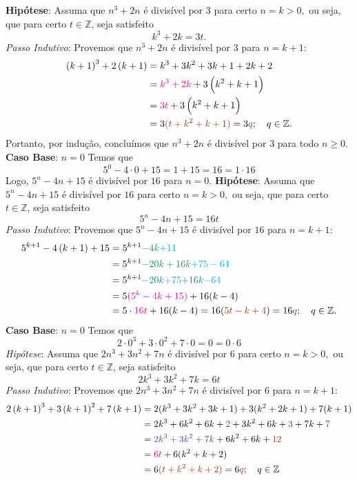 \documentclass[12pt, a4paper]{article}
\newcommand{\negrito}[1]{\mbox{\boldmath{$#1$}}}
\newcommand{\Z}{\mathbb{Z}}
\newcommand{\alt}[1]{\textcolor{Floresta}{$\negrito{(#1)} $}}
\begin{document}
\begin{solution}
{\textbf{Hipótese}: Assuma que $n^3 + 2n$ é divisível por $3$ para certo $n=k>0,$ ou seja, que para certo $t \in \Z$, seja satisfeito
$$k^{3}+2k=3t.$$
\textit{Passo Indutivo}: Provemos que $n^3 + 2n$ é divisível por $3$ para $n=k+1:$
\begin{align*}
\left( k+1 \right)^{3}+2 \left( k+1 \right) &=k^{3}+3k^{2}+3k+1+2k+2\\&=\textcolor{Magenta}{k^{3}+2k}+3 \left( k^{2}+k+1 \right)\\&=
\textcolor{Magenta}{3t}+3 \left( k^{2}+k+1 \right)\\&=3\textcolor{RawSienna}{(t+k^2 + k + 1)} =3\textcolor{RawSienna}{q};\quad q \in \Z.
\end{align*}
Portanto, por indução, concluímos que $n^3 + 2n$ é divisível por $3$ para todo $n \ge 0.$
\task[\alt{b}] \textbf{Caso Base}: $n=0$
Temos que
$$5^{0}-4\cdot0+15=1+15=16=1\cdot16$$
Logo, $5^n - 4n + 15$ é divisível por $16$ para $n = 0.$
\textbf{Hipótese}: Assuma que $5^n - 4n + 15$ é divisível por $16$ para certo $n=k>0,$ ou seja, que para certo $t \in \Z$, seja satisfeito
$$5^n - 4n + 15=16t$$
\textit{Passo Indutivo}: Provemos que $5^n - 4n + 15$ é divisível por $16$ para $n=k+1:$
\begin{align*} 5^{k+1}-4 \left( k+1 \right) +15&=5^{k+1} \textcolor{PineGreen}{- 4k} \textcolor{Cyan}{+ 11}\\&=5^{k+1} \textcolor{PineGreen}{- 20k + 16k} \textcolor{Cyan}{+ 75 - 64}\\&= 5^{ k+1} \textcolor{PineGreen}{- 20k} \textcolor{Cyan}{+ 75} \textcolor{PineGreen}{+ 16k} \textcolor{Cyan}{- 64}\\&= 5\textcolor{Magenta}{(5^{k} - 4k + 15)} + 16(k - 4)\\&=5 \cdot \textcolor{Magenta}{16t} + 16(k-4) = 16(\textcolor{RawSienna}{5t - k + 4}) = 16 \textcolor{RawSienna}{q};\quad q \in \Z.
\end{align*}
\task[\alt{c}] \textbf{Caso Base}: $n=0$
Temos que
$$2\cdot0^{3}+3\cdot0^{2}+7\cdot0=0=0\cdot6$$
\textit{Hipótese}: Assuma que $2n^3 + 3n^2 + 7n$ é divisível por $6$ para certo $n=k>0,$ ou seja, que para certo $t \in \Z$, seja satisfeito
$$2k^3 + 3k^2 + 7k=6t$$
\textit{Passo Indutivo}: Provemos que $2n^3 + 3n^2 + 7n$ é divisível por $6$ para $n=k+1:$
\begin{align*}
2 \left( k+1 \right) ^{3}+3 \left( k+1 \right) ^{2}+7 \left( k+1 \right) &= 2(k^3 + 3k^2 + 3k + 1) + 3(k^2 + 2k + 1) + 7(k+1) \\&=2k^{3}+6k^{2}+6k+\textcolor{Violet}{2}+3k^{2}+6k+\textcolor{Violet}{3}+7k+\textcolor{Violet}{7} \\&=\textcolor{Violet}{2k^{3}+3k^{2}+7k} +6k^{2}+6k+\textcolor{Mahogany}{12} \\&=\textcolor{Magenta}{6t} +6(k^{2}+k+2)\\&= 6 \textcolor{RawSienna}{(t+k^2+k+2)} = 6 \textcolor{RawSienna}{q}; \quad q \in \Z

\end{align*}}
\end{solution}
\end{document}
